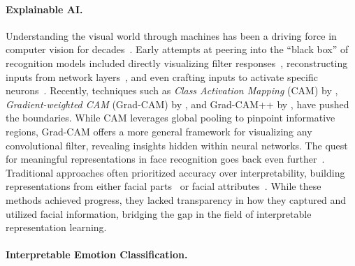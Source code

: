 \paragraph{Explainable AI.}

Understanding the visual world through machines has been a driving force in computer vision for decades~\cite{SudderthTFW05,parikh2011human,SinghGE12,JunejaVJZ13,MahendranV16}. 
Early attempts at peering into the ``black box'' of recognition models included directly visualizing filter responses~\cite{ZeilerF14}, 
reconstructing inputs from network layers~\cite{ZeilerTF11}, 
and even crafting inputs to activate specific neurons~\cite{NguyenYC15}.
Recently, techniques such as \textit{Class Activation Mapping} (CAM) by \citet{ZhouKLOT16}, 
\textit{Gradient-weighted CAM} (Grad-CAM) by \citet{SelvarajuCDVPB17}, 
and Grad-CAM++ by \citet{chattopadhay2018grad}, 
have pushed the boundaries. 
While CAM leverages global pooling to pinpoint informative regions, 
Grad-CAM offers a more general framework for visualizing any convolutional filter, 
revealing insights hidden within neural networks.
The quest for meaningful representations in face recognition goes back even further~\cite{ChenHLZ02,learned2016labeled,o2018face}. 
Traditional approaches often prioritized accuracy over interpretability, 
building representations from either facial parts~\cite{CaoYTS10,LiHLBY13} or facial attributes~\cite{KumarBBN09}. 
While these methods achieved progress, 
they lacked transparency in how they captured and utilized facial information, 
bridging the gap in the field of interpretable representation learning. 


\paragraph{Interpretable Emotion Classification.}

